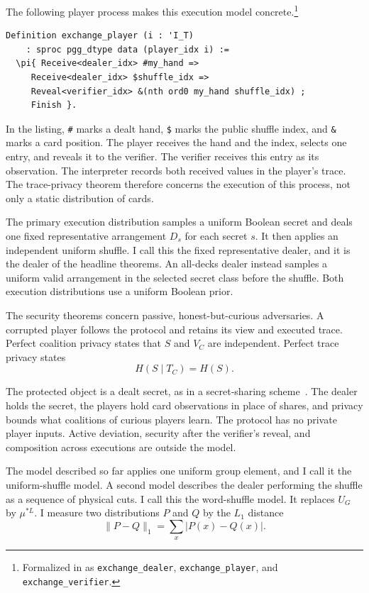 \documentclass[runningheads]{llncs}
\newcommand{\coqin}[1]{\texttt{#1}}
\begin{document}
The following player process makes this execution model
concrete.\footnote{Formalized in
 as
\coqin{exchange\_dealer}, \coqin{exchange\_player}, and
\coqin{exchange\_verifier}.}

\begin{lstlisting}
Definition exchange_player (i : 'I_T)
    : sproc pgg_dtype data (player_idx i) :=
  \pi{ Receive<dealer_idx> #my_hand =>
     Receive<dealer_idx> $shuffle_idx =>
     Reveal<verifier_idx> &(nth ord0 my_hand shuffle_idx) ;
     Finish }.
\end{lstlisting}

In the listing, \coqin{\#} marks a dealt hand, \coqin{\$} marks the
public shuffle index, and \coqin{\&} marks a card position. The player
receives the hand and the index, selects one entry, and reveals it to the
verifier. The verifier receives this entry as its observation. The interpreter
records both received values in the player's trace. The trace-privacy
theorem therefore concerns the execution of this process, not only a static
distribution of cards.

The primary execution distribution samples a uniform Boolean secret and
deals one fixed representative arrangement $D_s$ for each secret $s$. It
then applies an independent uniform shuffle. I call this the fixed
representative dealer, and it is the dealer of the headline theorems. An
all-decks dealer instead
samples a uniform valid arrangement in the selected secret class before the
shuffle. Both execution distributions use a uniform Boolean prior.

The security theorems concern passive, honest-but-curious adversaries. A
corrupted player follows the protocol and retains its view and executed
trace. Perfect coalition privacy states that $S$ and $V_C$ are independent.
Perfect trace privacy states
\begin{equation}
  H(S\mid T_C)=H(S).
  \label{eq:trace-privacy}
\end{equation}

The protected object is a dealt secret, as in a secret-sharing
scheme~\cite{Shamir1979}. The dealer holds the secret, the players hold
card observations in place of shares, and privacy bounds what coalitions of
curious players learn. The protocol has no private player inputs. Active
deviation, security after the verifier's reveal, and composition across
executions are outside the model.

The model described so far applies one uniform group element, and I call
it the uniform-shuffle model. A second model describes the dealer
performing the shuffle as a sequence of physical cuts. I call this the
word-shuffle model. It
replaces $U_G$ by $\mu^{*L}$. I measure two distributions $P$
and $Q$ by the $L_1$ distance
\begin{equation}
  \lVert P-Q\rVert_1=\sum_x\lvert P(x)-Q(x)\rvert.
  \label{eq:l1-definition}
\end{equation}
\end{document}
